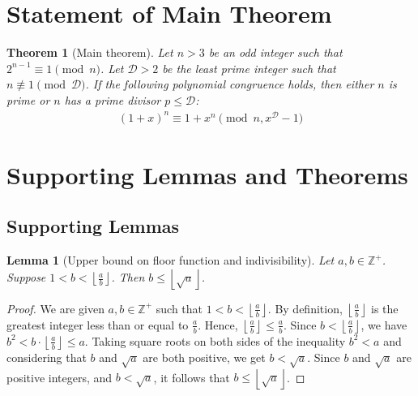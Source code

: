 \documentclass{article}
\theoremstyle{plain}
\theoremstyle{definition}
\newtheorem{theorem}{Theorem}
\newtheorem{lemma}{Lemma}
\newcommand{\Z}{\mathbb{Z}}
\newcommand{\D}{\mathcal{D}}
\begin{document}
\section{Statement of Main Theorem}
\begin{theorem}[Main theorem] \label{theorem:main}
\textit{Let $n > 3$ be an odd integer such that $2^{n-1} \equiv 1 \pmod{n}$. Let $\D > 2$ be the least prime integer such that $n \not\equiv 1 \pmod{\D}$. If the following polynomial congruence holds, then either $n$ is prime or $n$ has a prime divisor $p \leq \D$:}
\begin{align}
(1 + x)^n \equiv 1 + x^n \pmod{n, x^\D - 1}
\end{align}
\end{theorem}

\section{Supporting Lemmas and Theorems}

\subsection{Supporting Lemmas}

\begin{lemma}[Upper bound on floor function and indivisibility]
\label{lemma:floornondivisorupperbound}
\textit{Let $a,b \in \Z^{+}$. Suppose \( 1 < b < \left\lfloor \frac{a}{b} \right\rfloor \). Then \(b \leq \left\lfloor \sqrt{a} \right\rfloor\).}
\end{lemma}
\begin{proof}
We are given \( a, b \in \Z^{+} \) such that \( 1 < b < \left\lfloor \frac{a}{b} \right\rfloor \). By definition, \( \left\lfloor \frac{a}{b} \right\rfloor \) is the greatest integer less than or equal to \( \frac{a}{b} \). Hence, \( \left\lfloor \frac{a}{b} \right\rfloor \leq \frac{a}{b} \). Since \( b < \left\lfloor \frac{a}{b} \right\rfloor \), we have \( b^2 < b \cdot \left\lfloor \frac{a}{b} \right\rfloor \leq a \). Taking square roots on both sides of the inequality \( b^2 < a \) and considering that \( b \) and \( \sqrt{a} \) are both positive, we get \( b < \sqrt{a} \). Since \( b \) and \( \sqrt{a} \) are positive integers, and \( b < \sqrt{a} \), it follows that \( b \leq \left\lfloor \sqrt{a} \right\rfloor \).
\end{proof}
\end{document}
